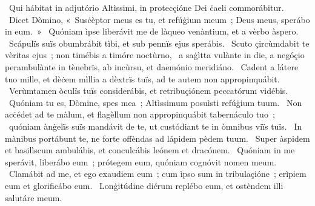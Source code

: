 ~Qui hábitat in adjutório Altìssimi, in protecçióne Dei ċaeli commorábitur. 
~Dicet Dòmino, «~Susċèptor meus es tu, et refúġium meum~; Deus meus, sperábo in eum.~»
~Quóniam ìpse liberávit me de làqueo venàntium, et a vèrbo àspero. 
~Scápulïs suïs obumbrábit tìbi, et sub pennïs ejus sperábis. 
~Scuto çircùmdabit te vèritas ejus~; non timébis a timóre noctùrno, 
~a saġìtta vulànte in die, a negóçio perambulànte in tènebrïs, ab incùrsu, et daemónio meridiáno. 
~Cadent a látere tuo mille, et dèċem mìllia a dèxtrïs tuïs, ad te autem non appropinquábit. 
~Verùmtamen òculïs tuïs considerábis, et retribuçiónem peccatórum vidébis. 
~Quóniam tu es, Dòmine, spes mea~; Altìssimum posuìsti refúġium tuum. 
~Non acċédet ad te màlum, et flagèllum non appropinquábit tabernáculo tuo~; 
~quóniam ànġelïs suïs mandávit de te, ut custódiant te in òmnibus viïs tuïs. 
~In mànibus portábunt te, ne forte offèndas ad lápidem pèdem tuum. 
~Super àspidem et basilìscum ambulábis, et conculcábis leónem et dracónem. 
~Quóniam in me sperávit, liberábo eum~; prótegem eum, quóniam cognóvit nomen meum. 
~Clamábit ad me, et ego exaudiem eum~; cum ìpso sum in tribulaçióne~; erìpiem eum et glorificábo eum. 
~Lonġitúdine diérum replébo eum, et ostèndem illi salutáre meum. 
